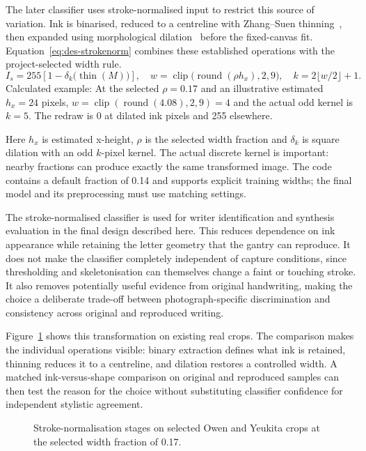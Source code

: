 The later classifier uses stroke-normalised input to restrict this source of variation. Ink is binarised, reduced to a centreline with Zhang--Suen thinning~\cite[p.~237]{zhang1984}, then expanded using morphological dilation~\cite[p.~533, Def.~1]{haralick1987} before the fixed-canvas fit. Equation~\ref{eq:des-strokenorm} combines these established operations with the project-selected width rule.
\begin{equation}
I_s=255\left[1-\delta_k\bigl(\operatorname{thin}(M)\bigr)\right],\quad
w=\operatorname{clip}\bigl(\operatorname{round}(\rho h_x),2,9\bigr),\quad
k=2\lfloor w/2\rfloor+1.
\label{eq:des-strokenorm}
\end{equation}
Calculated example: At the selected $\rho=0.17$ and an illustrative estimated $h_x=24$ pixels, $w=\operatorname{clip}(\operatorname{round}(4.08),2,9)=4$ and the actual odd kernel is $k=5$. The redraw is 0 at dilated ink pixels and 255 elsewhere.

Here $h_x$ is estimated x-height, $\rho$ is the selected width fraction and $\delta_k$ is square dilation with an odd $k$-pixel kernel. The actual discrete kernel is important: nearby fractions can produce exactly the same transformed image. The code contains a default fraction of 0.14 and supports explicit training widths; the final model and its preprocessing must use matching settings.

The stroke-normalised classifier is used for writer identification and synthesis evaluation in the final design described here. This reduces dependence on ink appearance while retaining the letter geometry that the gantry can reproduce. It does not make the classifier completely independent of capture conditions, since thresholding and skeletonisation can themselves change a faint or touching stroke. It also removes potentially useful evidence from original handwriting, making the choice a deliberate trade-off between photograph-specific discrimination and consistency across original and reproduced writing.

Figure~\ref{fig:des-strokenorm} shows this transformation on existing real crops. The comparison makes the individual operations visible: binary extraction defines what ink is retained, thinning reduces it to a centreline, and dilation restores a controlled width. A matched ink-versus-shape comparison on original and reproduced samples can then test the reason for the choice without substituting classifier confidence for independent stylistic agreement.


\begin{figure}[!htbp]\centering
{}
\caption{Stroke-normalisation stages on selected Owen and Yeukita crops at the selected width fraction of 0.17.}
\label{fig:des-strokenorm}
\end{figure}

